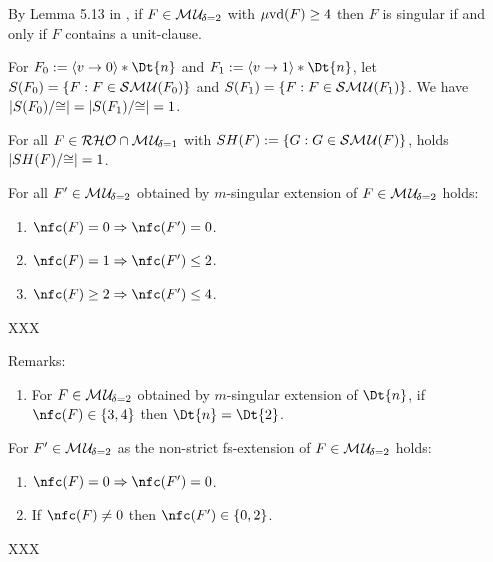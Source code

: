 \documentclass{article}
\begin{document}
\begin{lem}\label{lem:mu2-sing}
 By Lemma 5.13 in \cite{KullmannZhao2010Extremal}, if $F \in \mathcal{M\hspace{0.8pt}U}_{\!\delta=2}$ with $\operatorname{\mu\!\operatorname{vd}}(F) \ge 4$ then $F$ is singular if and only if $F$ contains a unit-clause.
\end{lem}  

\begin{conj}\label{con:horn-satur}
  For  $F_0:=\pao v0 * \Dt{n}$ and $F_1:=\pao v1 * \Dt{n}$, let $S(F_0)=\{ F:F \in \mathcal{S}\mathcal{M\hspace{0.8pt}U}(F_0) \}$ and $S(F_1)=\{ F:F \in \mathcal{S}\mathcal{M\hspace{0.8pt}U}(F_1) \}$. We have  $\lvert  S(F_0) / {\cong} \rvert=\lvert  S(F_1) / {\cong} \rvert=1$.
\end{conj}

\begin{conj}\label{con:Fn-split-satur}
  For all $F \in \mathcal{R}\mathcal{HO} \cap \mathcal{M\hspace{0.8pt}U}_{\!\delta=1}$ with $SH(F):=\{ G:G \in \mathcal{S}\mathcal{M\hspace{0.8pt}U}(F) \}$, holds $\lvert  SH(F) / {\cong} \rvert=1$.
\end{conj}

\begin{lem}\label{lem:mu2-fc-partition}
  For all $F'  \in \mathcal{M\hspace{0.8pt}U}_{\!\delta=2}$ obtained by $m$-singular extension of $F  \in \mathcal{M\hspace{0.8pt}U}_{\!\delta=2}$ holds:
  \begin{enumerate}
  \item $\nfc(F)=0 \Ra  \nfc(F')=0$.
  \item $\nfc(F)=1 \Ra  \nfc(F') \le 2$.
  \item $\nfc(F) \ge 2 \Ra  \nfc(F') \le 4$.
  \end{enumerate}
\end{lem}
\begin{prf}
  XXX
\end{prf}
Remarks:
  \begin{enumerate}
  \item  For $F  \in \mathcal{M\hspace{0.8pt}U}_{\!\delta=2}$ obtained by $m$-singular extension of $\Dt{n}$, if $\nfc(F) \in \set{3,4}$ then $\Dt{n}=\Dt{2}$.
  \end{enumerate}

\begin{lem}\label{lem:mu2-fc-count}
  For $F' \in \mathcal{M\hspace{0.8pt}U}_{\!\delta=2}$ as the non-strict fs-extension of $F \in \mathcal{M\hspace{0.8pt}U}_{\!\delta=2}$ holds:
  \begin{enumerate}
  \item $\nfc(F)=0 \Ra  \nfc(F')=0$.
  \item If $\nfc(F)\not =0$ then $\nfc(F') \in \set{0,2}$.
  \end{enumerate}
\end{lem}
\begin{prf}
  XXX
\end{prf}
\end{document}
